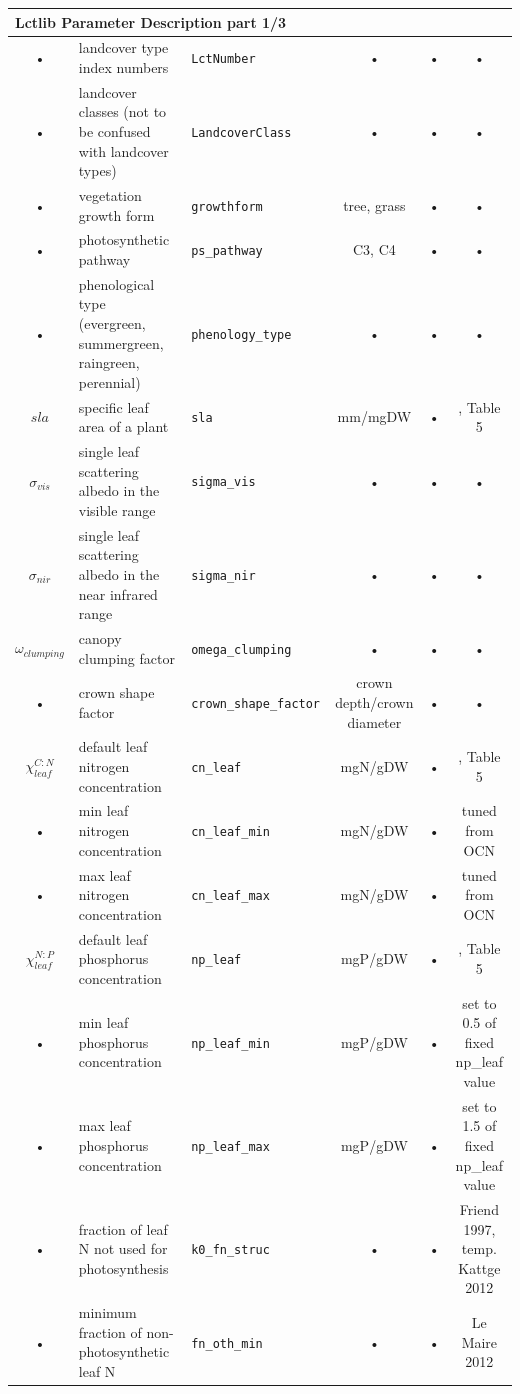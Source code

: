 \begin{table}
\begin{tabularx}{\linewidth}{|c|X|l|c|c|c|}
\multicolumn{6}{l}{\bf Lctlib Parameter Description part 1/3}\\
\hline
 • & landcover type index numbers & \texttt{LctNumber} & • & • & • \\
 • & landcover classes (not to be confused with landcover types) & \texttt{LandcoverClass} & • & • & • \\
 • & vegetation growth form & \texttt{growthform} & tree, grass & • & • \\
 • & photosynthetic pathway & \texttt{ps\_pathway} & C3, C4 & • & • \\
 • & phenological type (evergreen, summergreen, raingreen, perennial) & \texttt{phenology\_type} & • & • & • \\
$sla$ & specific leaf area of a plant & \texttt{sla} & mm/mgDW & • & \cite{Kattge:2011fc}, Table 5 \\
$\sigma_{vis}$ & single leaf scattering albedo in the visible range & \texttt{sigma\_vis} & • & • & • \\
$\sigma_{nir}$ & single leaf scattering albedo in the near infrared range & \texttt{sigma\_nir} & • & • & • \\
$\omega_{clumping}$ & canopy clumping factor & \texttt{omega\_clumping} & • & • & • \\
 • & crown shape factor & \texttt{crown\_shape\_factor} & crown depth/crown diameter & • & • \\
$\chi_{leaf}^{C:N}$ & default leaf nitrogen concentration & \texttt{cn\_leaf} & mgN/gDW & • & \cite{Kattge:2011fc}, Table 5 \\
 • & min leaf nitrogen concentration & \texttt{cn\_leaf\_min} & mgN/gDW & • & tuned from OCN \\
 • & max leaf nitrogen concentration & \texttt{cn\_leaf\_max} & mgN/gDW & • & tuned from OCN \\
$\chi_{leaf}^{N:P}$ & default leaf phosphorus concentration & \texttt{np\_leaf} & mgP/gDW & • & \cite{Kattge:2011fc}, Table 5 \\
 • & min leaf phosphorus concentration & \texttt{np\_leaf\_min} & mgP/gDW & • & set to 0.5 of fixed np\_leaf value \\
 • & max leaf phosphorus concentration & \texttt{np\_leaf\_max} & mgP/gDW & • & set to 1.5 of fixed np\_leaf value \\
 • & fraction of leaf N not used for photosynthesis & \texttt{k0\_fn\_struc} & • & • & Friend 1997, temp. Kattge 2012 \\
 • & minimum fraction of non-photosynthetic leaf N & \texttt{fn\_oth\_min} & • & • & Le Maire 2012 \\

\end{tabularx}
\end{table}
